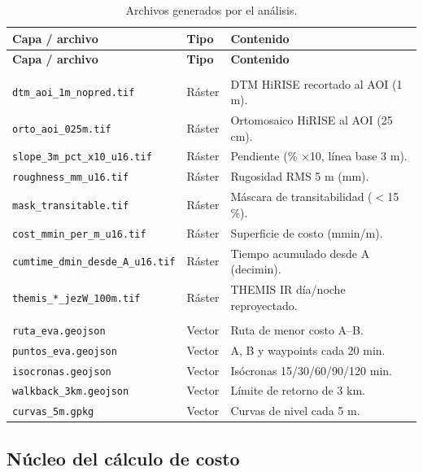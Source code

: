\documentclass{article}
\begin{document}
{\small
\begin{longtable}{>{\raggedright\arraybackslash}p{5.6cm} >{\raggedright\arraybackslash}p{1.8cm} >{\raggedright\arraybackslash}p{8.1cm}}
\caption{Archivos generados por el análisis.}\label{tab:archivos}\\
\toprule
\textbf{Capa / archivo} & \textbf{Tipo} & \textbf{Contenido} \\
\midrule
\endfirsthead
\toprule
\textbf{Capa / archivo} & \textbf{Tipo} & \textbf{Contenido} \\
\midrule
\endhead
\multicolumn{3}{l}{\textit{02\_procesado}}\\
\texttt{dtm\_aoi\_1m\_nopred.tif} & Ráster & DTM HiRISE recortado al AOI (1 m). \\
\texttt{orto\_aoi\_025m.tif} & Ráster & Ortomosaico HiRISE al AOI (25 cm). \\
\texttt{slope\_3m\_pct\_x10\_u16.tif} & Ráster & Pendiente (\% $\times$10, línea base 3 m). \\
\texttt{roughness\_mm\_u16.tif} & Ráster & Rugosidad RMS 5 m (mm). \\
\texttt{mask\_transitable.tif} & Ráster & Máscara de transitabilidad ($<$15\,\%). \\
\texttt{cost\_mmin\_per\_m\_u16.tif} & Ráster & Superficie de costo (mmin/m). \\
\texttt{cumtime\_dmin\_desde\_A\_u16.tif} & Ráster & Tiempo acumulado desde A (decimin). \\
\texttt{themis\_*\_jezW\_100m.tif} & Ráster & THEMIS IR día/noche reproyectado. \\
\multicolumn{3}{l}{\textit{03\_resultados}}\\
\texttt{ruta\_eva.geojson} & Vector & Ruta de menor costo A--B. \\
\texttt{puntos\_eva.geojson} & Vector & A, B y waypoints cada 20 min. \\
\texttt{isocronas.geojson} & Vector & Isócronas 15/30/60/90/120 min. \\
\texttt{walkback\_3km.geojson} & Vector & Límite de retorno de 3 km. \\
\texttt{curvas\_5m.gpkg} & Vector & Curvas de nivel cada 5 m. \\
\bottomrule
\end{longtable}
}

\subsection{Núcleo del cálculo de costo}
\end{document}

